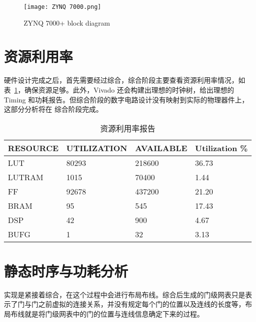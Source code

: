\begin{figure}[!htbp]
    \centering
    \texttt{[image: ZYNQ 7000.png]}
    \caption{ZYNQ 7000+ block diagram}
    \label{fig:ZYNQ 7000+}
\end{figure}

\section{资源利用率}

硬件设计完成之后，首先需要经过综合，综合阶段主要查看资源利用率情况，如表~\ref{tab:Resource Report}，确保资源足够。此外，Vivado 还会构建出理想的时钟树，给出理想的 Timing 和功耗报告。但综合阶段的数字电路设计没有映射到实际的物理器件上，这部分分析将在 综合阶段完成。

\begin{table}[!htbp]
    \caption{资源利用率报告}
    \label{tab:Resource Report}
    \centering
    \footnotesize%
    \setlength{\tabcolsep}{4pt}%
    \renewcommand{\arraystretch}{1.2}%
    \begin{tabular}{llll}
        \toprule
        \textbf{RESOURCE} & \textbf{UTILIZATION} & \textbf{AVAILABLE} & \textbf{Utilization \%} \\
        \midrule
        LUT               & 80293                & 218600               & 36.73                   \\
        LUTRAM            & 1015                 & 70400                & 1.44                    \\
        FF                & 92678                & 437200               & 21.20                   \\
        BRAM              & 95                   & 545                  & 17.43                   \\
        DSP               & 42                   & 900                  & 4.67                    \\
        BUFG              & 1                    & 32                   & 3.13                    \\
        \bottomrule                   
    \end{tabular}
\end{table}

\section{静态时序与功耗分析}

实现是紧接着综合，在这个过程中会进行布局布线。综合后生成的门级网表只是表示了门与门之前虚拟的连接关系，并没有规定每个门的位置以及连线的长度等，布局布线就是将门级网表中的门的位置与连线信息确定下来的过程。

